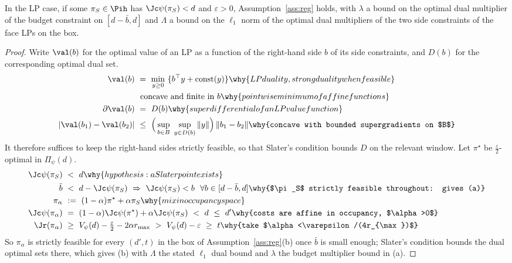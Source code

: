 \begin{lemma}
\label{lem:lpreg}
In the LP case, if some $\pi_S\in\Pih$ has $\Jc\psi(\pi_S)<d$ and
$\varepsilon>0$, Assumption~\ref{ass:reg} holds, with $\lambda$ a bound on
the optimal dual multiplier of the budget constraint on $[d-\bar b,d]$ and
$\Lambda$ a bound on the $\ell_1$ norm of the optimal dual multipliers of the
two side constraints of the face LPs on the box.
\end{lemma}
\begin{proof}
Write $\val(b)$ for the optimal value of an LP as a function of the
right-hand side $b$ of its side constraints, and $D(b)$ for the
corresponding optimal dual set.
\begin{align*}
\val(b)\ &=\ \min_{y\ge0}\ \{b^\top y+\text{const}(y)\}
   \why{LP duality, strong duality when feasible}\\
   &\ \text{concave and finite in }b
   \why{pointwise minimum of affine functions}\\
\partial\val(b)\ &=\ D(b)
   \why{superdifferential of an LP value function}\\
|\val(b_1)-\val(b_2)|\ &\le\ \Big(\sup_{b\in B}\ \sup_{y\in D(b)}\|y\|\Big)\,\|b_1-b_2\|
   \why{concave with bounded supergradients on $B$}
\end{align*}
It therefore suffices to keep the right-hand sides strictly feasible, so that
Slater's condition bounds $D$ on the relevant window. Let $\pi^\star$ be
$\tfrac\varepsilon2$-optimal in $\Pi_\psi(d)$.
\begin{align*}
\Jc\psi(\pi_S)\ &<\ d \why{hypothesis: a Slater point exists}\\
\bar b\ &<\ d-\Jc\psi(\pi_S)\ \Rightarrow\ \Jc\psi(\pi_S)<b\ \ \forall b\in[d-\bar b,d]
   \why{$\pi_S$ strictly feasible throughout: gives (a)}\\
\pi_\alpha\ &:=\ (1-\alpha)\pi^\star+\alpha\pi_S
   \why{mix in occupancy space}\\
\Jc\psi(\pi_\alpha)\ &=\ (1-\alpha)\Jc\psi(\pi^\star)+\alpha\Jc\psi(\pi_S)\ <\ d\ \le\ d'
   \why{costs are affine in occupancy, $\alpha>0$}\\
\Jr(\pi_\alpha)\ &\ge\ V_\psi(d)-\tfrac\varepsilon2-2\alpha r_{\max}\ >\ V_\psi(d)-\varepsilon\ \ge\ t
   \why{take $\alpha<\varepsilon/(4r_{\max})$}
\end{align*}
So $\pi_\alpha$ is strictly feasible for every $(d',t)$ in the box of
Assumption~\ref{ass:reg}(b) once $\bar b$ is small enough; Slater's condition
bounds the dual optimal sets there, which gives (b) with $\Lambda$ the stated
$\ell_1$ dual bound and $\lambda$ the budget multiplier bound in (a).
\end{proof}

